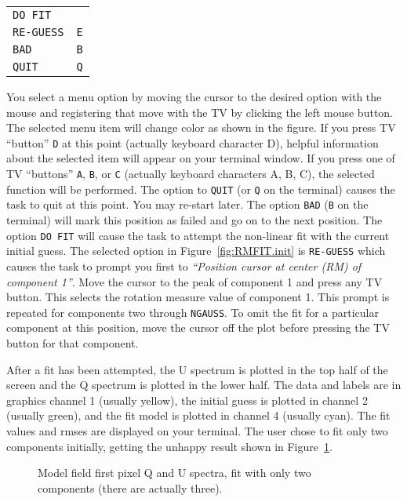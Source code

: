 \documentclass[twoside]{article}
\newcommand{\putfig}[1]{\texttt{[image: \#1.eps]}}
\begin{document}
\begin{center}
\begin{tabular}{|l|l|}\hline
   {\tt DO FIT}   & {\tt \hphantom{A}} \\
   {\tt RE-GUESS} & {\tt E} \\
   {\tt BAD}      & {\tt B} \\
   {\tt QUIT}     & {\tt Q} \\ \hline
\end{tabular}
\end{center}
You select a menu option by moving the cursor to the desired option
with the mouse and registering that move with the TV by clicking the
left mouse button.  The selected menu item will change color as shown
in the figure.  If you press TV ``button'' {\tt D} at this point
(actually keyboard character D), helpful information about the
selected item will appear on your terminal window.  If you press one
of TV ``buttons'' {\tt A}, {\tt B}, or {\tt C} (actually keyboard
characters A, B, C), the selected function will be performed.  The
option to {\tt QUIT} (or {\tt Q} on the terminal) causes the task to
quit at this point.  You may re-start later.  The option {\tt BAD}
({\tt B} on the terminal) will mark this position as failed and go on
to the next position.  The option {\tt DO FIT} will cause the task to
attempt the non-linear fit with the current initial guess.  The
selected option in Figure~\ref{fig:RMFIT.init} is {\tt RE-GUESS} which
causes the task to prompt you first to {\it ``Position cursor at
  center (RM) of component 1''}.  Move the cursor to the peak of
component 1 and press any TV button.  This selects the rotation
measure value of component 1.  This prompt is repeated for components
two through {\tt NGAUSS}\@.  To omit the fit for a particular
component at this position, move the cursor off the plot before
pressing the TV button for that component.

After a fit has been attempted, the U spectrum is plotted in the top
half of the screen and the Q spectrum is plotted in the lower half.
The data and labels are in graphics channel 1 (usually yellow), the
initial guess is plotted in channel 2 (usually green), and the fit
model is plotted in channel 4 (usually cyan).  The fit values and
rmses are displayed on your terminal.  The user chose to fit only two
components initially, getting the unhappy result shown in
Figure~\ref{fig:RMFIT.2bad}.

\begin{figure}
\begin{center}
\resizebox{6.0in}{!}{\putfig{RMFIT.2bad}}
\caption{Model field first pixel Q and U spectra, fit with only two
  components (there are actually three).}
\label{fig:RMFIT.2bad}
\end{center}
\end{figure}
\end{document}
